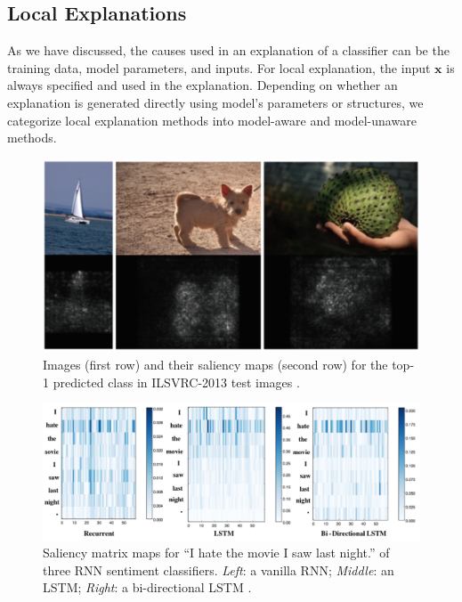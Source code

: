 


\subsection{Local Explanations}

As we have discussed, the causes used in an explanation of a classifier can be the training data, model parameters, and inputs. For local explanation, the input $\mathbf{x}$ is always specified and used in the explanation. Depending on whether an explanation is generated directly using model's parameters or structures, we categorize local explanation methods into model-aware and model-unaware methods.

\begin{figure}[tb]
  \centering
  \includegraphics[width=1.0\textwidth]{figure/saliency-map}
  \caption{Images (first row) and their saliency maps (second row) for the top-1 predicted class in ILSVRC-2013 test images \cite{simonyan14saliency}.}
  \label{fig:saliency-map}
\end{figure}

\begin{figure}[tb]
  \centering
  \includegraphics[width=1.0\textwidth]{figure/saliency-map-rnn}
  \caption{Saliency matrix maps for ``I hate the movie I saw last night.'' of three RNN sentiment classifiers. \textit{Left}: a vanilla RNN; \textit{Middle}: an LSTM; \textit{Right}: a bi-directional LSTM \cite{simonyan14saliency}.}
  \label{fig:saliency-map-rnn}
\end{figure}

